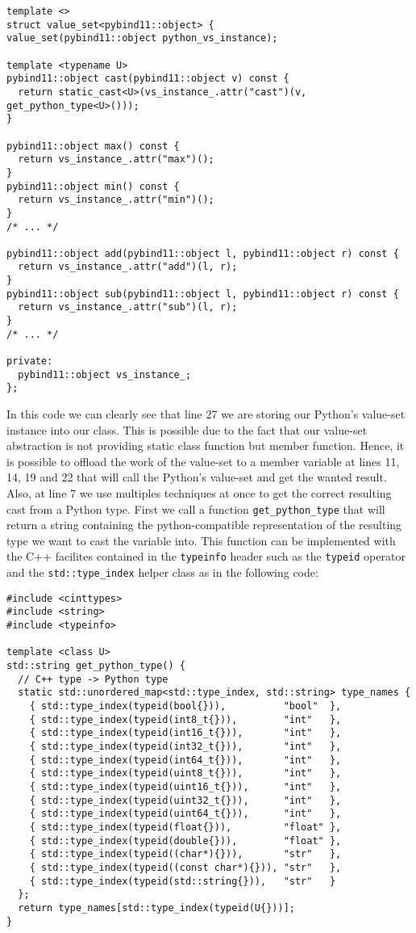 \begin{verbatim}
template <>
struct value_set<pybind11::object> {
value_set(pybind11::object python_vs_instance);

template <typename U>
pybind11::object cast(pybind11::object v) const {
  return static_cast<U>(vs_instance_.attr("cast")(v, get_python_type<U>()));
}

pybind11::object max() const {
  return vs_instance_.attr("max")();
}
pybind11::object min() const {
  return vs_instance_.attr("min")();
}
/* ... */

pybind11::object add(pybind11::object l, pybind11::object r) const {
  return vs_instance_.attr("add")(l, r);
}
pybind11::object sub(pybind11::object l, pybind11::object r) const {
  return vs_instance_.attr("sub")(l, r);
}
/* ... */

private:
  pybind11::object vs_instance_;
};
\end{verbatim}

In this code we can clearly see that line 27 we are storing our Python's value-set instance into our class. This is
possible due to the fact that our value-set abstraction is not providing static class function but member function.
Hence, it is possible to offload the work of the value-set to a member variable at lines 11, 14, 19 and 22 that will
call the Python's value-set and get the wanted result. Also, at line 7 we use multiples techniques at once to get the
correct resulting cast from a Python type. First we call a function \texttt{get\_python\_type} that will return a string
containing the python-compatible representation of the resulting type we want to cast the variable into. This function
can be implemented with the C++ facilites contained in the \texttt{typeinfo} header such as the \texttt{typeid} operator
and the \texttt{std::type\_index} helper class as in the following code:

\begin{verbatim}
#include <cinttypes>
#include <string>
#include <typeinfo>

template <class U>
std::string get_python_type() {
  // C++ type -> Python type
  static std::unordered_map<std::type_index, std::string> type_names {
    { std::type_index(typeid(bool{})),          "bool"  },
    { std::type_index(typeid(int8_t{})),        "int"   },
    { std::type_index(typeid(int16_t{})),       "int"   },
    { std::type_index(typeid(int32_t{})),       "int"   },
    { std::type_index(typeid(int64_t{})),       "int"   },
    { std::type_index(typeid(uint8_t{})),       "int"   },
    { std::type_index(typeid(uint16_t{})),      "int"   },
    { std::type_index(typeid(uint32_t{})),      "int"   },
    { std::type_index(typeid(uint64_t{})),      "int"   },
    { std::type_index(typeid(float{})),         "float" },
    { std::type_index(typeid(double{})),        "float" },
    { std::type_index(typeid((char*){})),       "str"   },
    { std::type_index(typeid((const char*){})), "str"   },
    { std::type_index(typeid(std::string{})),   "str"   }
  };
  return type_names[std::type_index(typeid(U{}))];
}
\end{verbatim}

